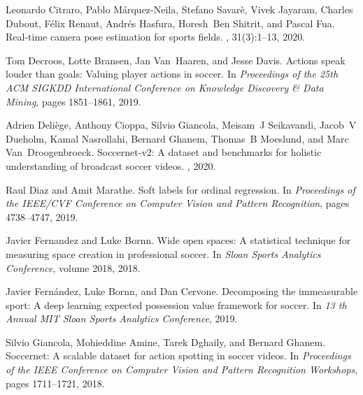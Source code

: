 \documentclass{article}
\begin{document}
\begin{thebibliography}{}
Leonardo Citraro, Pablo M{\'a}rquez-Neila, Stefano Savar{\`e}, Vivek Jayaram,
  Charles Dubout, F{\'e}lix Renaut, Andr{\'e}s Hasfura, Horesh~Ben Shitrit, and
  Pascal Fua.
\newblock Real-time camera pose estimation for sports fields.
, 31(3):1--13, 2020.

Tom Decroos, Lotte Bransen, Jan Van~Haaren, and Jesse Davis.
\newblock Actions speak louder than goals: Valuing player actions in soccer.
\newblock In {\em Proceedings of the 25th ACM SIGKDD International Conference
  on Knowledge Discovery \& Data Mining}, pages 1851--1861, 2019.

Adrien Deli{\`e}ge, Anthony Cioppa, Silvio Giancola, Meisam~J Seikavandi,
  Jacob~V Dueholm, Kamal Nasrollahi, Bernard Ghanem, Thomas~B Moeslund, and
  Marc Van~Droogenbroeck.
\newblock Soccernet-v2: A dataset and benchmarks for holistic understanding of
  broadcast soccer videos.
, 2020.

Raul Diaz and Amit Marathe.
\newblock Soft labels for ordinal regression.
\newblock In {\em Proceedings of the IEEE/CVF Conference on Computer Vision and
  Pattern Recognition}, pages 4738--4747, 2019.

Javier Fernandez and Luke Bornn.
\newblock Wide open spaces: A statistical technique for measuring space
  creation in professional soccer.
\newblock In {\em Sloan Sports Analytics Conference}, volume 2018, 2018.

Javier Fern{\'a}ndez, Luke Bornn, and Dan Cervone.
\newblock Decomposing the immeasurable sport: A deep learning expected
  possession value framework for soccer.
\newblock In {\em 13 th Annual MIT Sloan Sports Analytics Conference}, 2019.

Silvio Giancola, Mohieddine Amine, Tarek Dghaily, and Bernard Ghanem.
\newblock Soccernet: A scalable dataset for action spotting in soccer videos.
\newblock In {\em Proceedings of the IEEE Conference on Computer Vision and
  Pattern Recognition Workshops}, pages 1711--1721, 2018.


\end{thebibliography}
\end{document}
